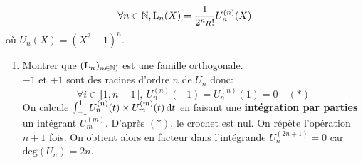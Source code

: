 $$\forall n \in \mathbb{N}, \mathrm{L}_n(X) = \frac{1}{2^n n!} U_n^{(n)}(X)$$
où $U_n(X) = (X^2-1)^n$.

\begin{enumerate}
    \item Montrer que $(\mathrm{L}_n)_{n \in \mathbb{N})}$ est une famille orthogonale. \\
    $-1$ et $+1$ sont des racines d'ordre $n$ de $U_n$ donc:
    $$\forall i \in \llbracket 1, n-1 \rrbracket,\ U_n^{(n)}(-1) = U_n^{(n)}(1) = 0 \quad (*)$$
    On calcule $\int_{-1}^{1} U_n^{(n)}(t) \times U_m^{(m)}(t)\, \mathrm{d} t$ en faisant une \textbf{intégration par parties} un intégrant $U_m^{(m)}$. D'après $(*)$, le crochet est nul. On répète l'opération $n+1$ fois. On obtient alors en facteur dans l'intégrande $U_n^{(2n+1)} = 0$ car $\mathrm{deg}(U_n) = 2n$.
\end{enumerate}